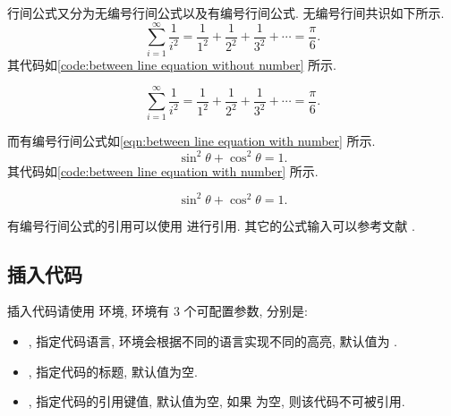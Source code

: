 \documentclass{./template/article}
\begin{document}
行间公式又分为无编号行间公式以及有编号行间公式. 无编号行间共识如下所示.%
%
\begin{equation*}
  \sum_{i=1}^\infty \frac{1}{i^2} = \frac{1}{1^2} + \frac{1}{2^2} + \frac{1}{3^2} + \cdots = \frac{\pi}{6}\text{.}
\end{equation*}%
%
其代码如\cref{code:between line equation without number} 所示.%
%
\begin{latexbox}[
  language = latex,
  caption = 无编号行间公式,
  label = code:between line equation without number
]
\begin{equation*}
  \sum_{i=1}^\infty \frac{1}{i^2} = \frac{1}{1^2} + \frac{1}{2^2} + \frac{1}{3^2} + \cdots = \frac{\pi}{6}\text{.}
\end{equation*}
\end{latexbox}
%
而有编号行间公式如\cref{eqn:between line equation with number} 所示.%
%
\begin{equation}\label{eqn:between line equation with number}
  \sin^2\theta + \cos^2\theta = 1\text{.}
\end{equation}%
%
其代码如\cref{code:between line equation with number} 所示.%
%
\begin{latexbox}[
  language = latex,
  caption = 有编号行间公式,
  label = code:between line equation with number
]
\begin{equation}\label{eqn:between line equation with number}
  \sin^2\theta + \cos^2\theta = 1\text{.}
\end{equation}
\end{latexbox}
%
有编号行间公式的引用可以使用  进行引用. 其它的公式输入可以参考文献 \cite{lshort}.

\subsection{插入代码}
插入代码请使用  环境,  环境有 3 个可配置参数, 分别是:%
%
\begin{itemize}
  \item {}, 指定代码语言,  环境会根据不同的语言实现不同的高亮, 默认值为 .
  \item {}, 指定代码的标题, 默认值为空.
  \item {}, 指定代码的引用键值, 默认值为空, 如果  为空, 则该代码不可被引用.
\end{itemize}
\end{document}
